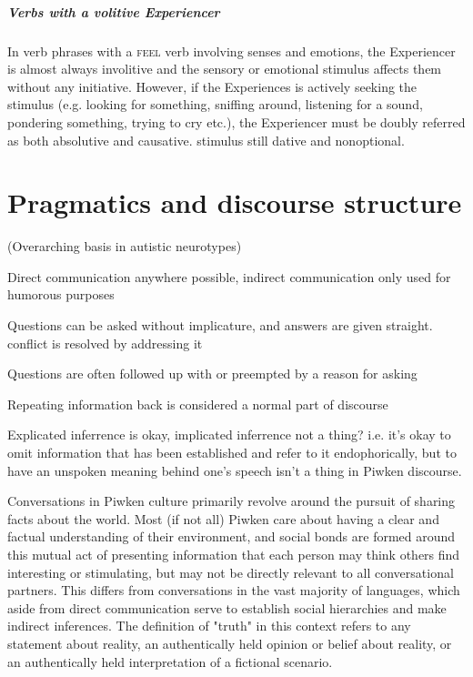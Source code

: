 \documentclass[smallroyalvopaper,9pt]{memoir}
\newcommand{\langeng}{Piwken}
\begin{document}
\subsubsection{Verbs with a volitive Experiencer}

In verb phrases with a \textsc{feel} verb involving senses and emotions, the Experiencer is almost always involitive and the sensory or emotional stimulus affects them without any initiative. However, if the Experiences is actively seeking the stimulus (e.g. looking for something, sniffing around, listening for a sound, pondering something, trying to cry etc.), the Experiencer must be doubly referred as both absolutive and causative. stimulus still dative and nonoptional.

\part{Pragmatics and discourse structure}

(Overarching basis in autistic neurotypes)

Direct communication anywhere possible, indirect communication only used for humorous purposes

Questions can be asked without implicature, and answers are given straight. conflict is resolved by addressing it

Questions are often followed up with or preempted by a reason for asking

Repeating information back is considered a normal part of discourse

Explicated inferrence is okay, implicated inferrence not a thing? i.e. it's okay to omit information that has been established and refer to it endophorically, but to have an unspoken meaning behind one's speech isn't a thing in Piwken discourse.

Conversations in \langeng{} culture primarily revolve around the pursuit of sharing facts about the world. Most (if not all) \langeng{} care about having a clear and factual understanding of their environment, and social bonds are formed around this mutual act of presenting information that each person may think others find interesting or stimulating, but may not be directly relevant to all conversational partners. This differs from conversations in the vast majority of languages, which aside from direct communication serve to establish social hierarchies and make indirect inferences. The definition of "truth" in this context refers to any statement about reality, an authentically held opinion or belief about reality, or an authentically held interpretation of a fictional scenario. 
\end{document}
